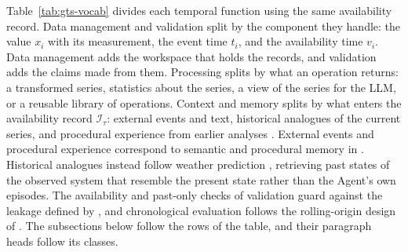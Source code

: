 \documentclass[preprints,article,submit,moreauthors]{Definitions/mdpi}
\begin{document}
Table~\ref{tab:gts-vocab} divides each temporal function using the same availability record. Data management and validation split by the component they handle: the value $x_i$ with its measurement, the event time $t_i$, and the availability time $v_i$. Data management adds the workspace that holds the records, and validation adds the claims made from them. Processing splits by what an operation returns: a transformed series, statistics about the series, a view of the series for the LLM, or a reusable library of operations. Context and memory splits by what enters the availability record $\mathcal{I}_\tau$: external events and text, historical analogues of the current series, and procedural experience from earlier analyses \citep{chen2026tsagentsurvey}. External events and procedural experience correspond to semantic and procedural memory in \citet{sumers2024coala}. Historical analogues instead follow weather prediction \citep{lorenz1969analogues}, retrieving past states of the observed system that resemble the present state rather than the Agent's own episodes. The availability and past-only checks of validation guard against the leakage defined by \citet{kaufman2012leakage}, and chronological evaluation follows the rolling-origin design of \citet{tashman2000outofsample}. The subsections below follow the rows of the table, and their paragraph heads follow its classes.
\end{document}
